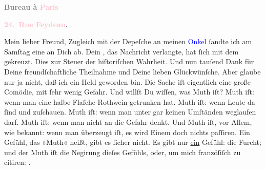            \begin{otherlanguage}{french}\textcolor{gray}{\textbf{\textbf{Bureau à \textcolor{pink}{Paris}{}\ledrightnote{\textcolor{pink}{Paris}}}}}\end{otherlanguage}\pend
           \pstart
           \begin{otherlanguage}{french}\textcolor{gray}{\textbf{\textbf{\textcolor{pink}{24. Rue Feydeau}{}\ledrightnote{\textcolor{pink}{rue Feydeau}}.}}}\end{otherlanguage}\pend
           \pstart{}Mein lieber Freund,\pend\pstart
           Zugleich mit der Depeſche an meinen \textcolor{blue}{Onkel}{} ſandte ich am Samſtag
               eine an Dich ab.  Dein \label{K_L02791-1v}\label{K_L02791-1h}, das  Nachricht verlangte, hat ſich mit dem \label{K_L02791-2v}\label{K_L02791-2h} gekreuzt. Dies zur Steuer der hiſtoriſchen Wahrheit.\pend
           \pstart
           Und nun  tauſend Dank für Deine freundſchaftliche Theilnahme und Deine lieben
               Glückwünſche. Aber glaube nur  ja nicht, daß ich
               ein  Held geworden bin. Die Sache iſt eigentlich
               eine große Comödie, mit ſehr wenig Gefahr. Und willſt Du {\pb}wiſſen, was Muth iſt? Muth iſt: wenn man \label{K_L02791-3v}\label{K_L02791-3h} eine halbe Flaſche Rothwein
               getrunken hat. Muth iſt: wenn Leute da ſind und zuſchauen. Muth iſt: wenn man unter
               gar keinen Umſtänden weglaufen darf. Muth iſt: wenn man nicht an die Gefahr denkt.
               Und Muth iſt, vor Allem, wie bekannt: wenn man überzeugt iſt, es wird Einem doch
               nichts paſſiren.\pend
           \pstart
           Ein Gefühl, das »Muth« heißt, gibt es ſicher nicht. Es gibt nur \uline{ein} Gefühl: die Furcht; und der Muth iſt die Negirung dieſes {\pb}Gefühls, oder, um mich franzöſiſch zu citiren:
                  \label{K_L02791-55v}\label{K_L02791-55h}.\pend

